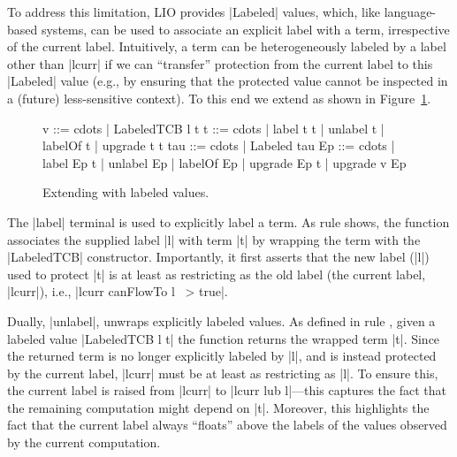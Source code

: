 To address this limitation, LIO provides |Labeled| values, which, like
language-based systems, can be used to associate an explicit label
with a term, irrespective of the current label.
%
Intuitively, a term can be heterogeneously labeled by a label other
than |lcurr| if we can ``transfer'' protection from the current label
to this |Labeled| value (e.g., by ensuring that the protected value
cannot be inspected in a (future) less-sensitive context).
%
To this end we extend \lio{} as shown in Figure~\ref{fig:sos:labeled}.
\begin{figure}[ht] %
\small
\begin{code}
v    ::= cdots  | LabeledTCB l t
t    ::= cdots  | label t t | unlabel t | labelOf t | upgrade t t
tau  ::= cdots  | Labeled tau
Ep   ::= cdots  | label Ep t | unlabel Ep | labelOf Ep
                | upgrade Ep t | upgrade v Ep
\end{code}

\caption{Extending \lio{} with labeled values\label{fig:sos:labeled}.}
\end{figure}

The |label| terminal is used to explicitly label a term.
%
As rule  shows, the function associates the supplied
label |l| with term |t| by wrapping the term with the |LabeledTCB|
constructor.
%
Importantly, it first asserts that the new label (|l|) used to
protect |t| is at least as restricting as the old label (the current
label, |lcurr|), i.e., |lcurr canFlowTo l ~> true|.
 
Dually, |unlabel|, unwraps explicitly labeled values.
%
As defined in rule , given a labeled value
|LabeledTCB l t| the function returns the wrapped term |t|.
%
Since the returned term is no longer explicitly labeled by |l|, and
is instead protected by the current label, |lcurr| must be at least
as restricting as |l|.
%
To ensure this, the current label is raised from |lcurr| to |lcurr lub
l|---this captures the fact that the remaining computation might
depend on |t|. 
%
Moreover, this highlights the fact that the current label always
``floats'' above the labels of the values observed by the current
computation.

